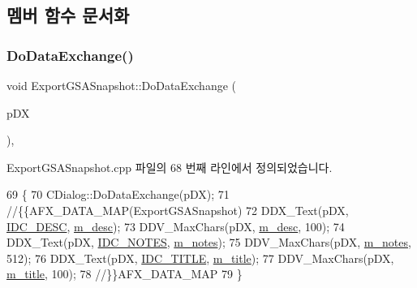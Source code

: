 \subsection{멤버 함수 문서화}
\mbox{\label{class_export_g_s_a_snapshot_a892a749aacc888d1408cb8fb85c950c9}} 
\subsubsection{\texorpdfstring{Do\+Data\+Exchange()}{DoDataExchange()}}
{\footnotesize\ttfamily void Export\+G\+S\+A\+Snapshot\+::\+Do\+Data\+Exchange (\begin{DoxyParamCaption}\item[{C\+Data\+Exchange $\ast$}]{p\+DX }\end{DoxyParamCaption})\hspace{0.3cm}{\ttfamily [protected]}, {\ttfamily [virtual]}}



Export\+G\+S\+A\+Snapshot.\+cpp 파일의 68 번째 라인에서 정의되었습니다.


\begin{DoxyCode}
69 \{
70   CDialog::DoDataExchange(pDX);
71   \textcolor{comment}{//\{\{AFX\_DATA\_MAP(ExportGSASnapshot)}
72   DDX\_Text(pDX, \mbox{\hyperlink{resource_8h_adb05cf1e74135587a9b3ab93a5152feb}{IDC\_DESC}}, \mbox{\hyperlink{class_export_g_s_a_snapshot_afbd1310c7508cf3620cdc29dcb5871cc}{m\_desc}});
73   DDV\_MaxChars(pDX, \mbox{\hyperlink{class_export_g_s_a_snapshot_afbd1310c7508cf3620cdc29dcb5871cc}{m\_desc}}, 100);
74   DDX\_Text(pDX, \mbox{\hyperlink{resource_8h_a7555e82bd57225629db18d651d2794d5}{IDC\_NOTES}}, \mbox{\hyperlink{class_export_g_s_a_snapshot_ac070b8dc915716aad113bae269ce6e97}{m\_notes}});
75   DDV\_MaxChars(pDX, \mbox{\hyperlink{class_export_g_s_a_snapshot_ac070b8dc915716aad113bae269ce6e97}{m\_notes}}, 512);
76   DDX\_Text(pDX, \mbox{\hyperlink{resource_8h_a4655f91533a76195a33f52c29af3aa8d}{IDC\_TITLE}}, \mbox{\hyperlink{class_export_g_s_a_snapshot_a8e7e31444aaab44e9216958e17fceb5d}{m\_title}});
77   DDV\_MaxChars(pDX, \mbox{\hyperlink{class_export_g_s_a_snapshot_a8e7e31444aaab44e9216958e17fceb5d}{m\_title}}, 100);
78   \textcolor{comment}{//\}\}AFX\_DATA\_MAP}
79 \}
\end{DoxyCode}
\mbox{\label{class_export_g_s_a_snapshot_a233d4db37eebfb2286379e5ffe757667}} 
